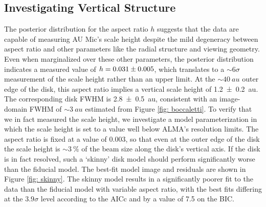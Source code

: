 \documentclass[modern]{aastex62}
\begin{document}
\subsection{Investigating Vertical Structure}
\label{subsection: vertical analysis}

The posterior distribution for the aspect ratio $h$ suggests that the data are capable of measuring AU Mic's scale height despite the mild degeneracy between aspect ratio and other parameters like the radial structure and viewing geometry.  
Even when marginalized over these other parameters, the posterior distribution indicates a measured value of $h=\num{0.031 \pm 0.005}$, which translates to a $\sim 6 \sigma$ measurement of the scale height rather than an upper limit.
At the $\sim \SI{40}{au}$ outer edge of the disk, this aspect ratio implies a vertical scale height of \SI{1.2 \pm 0.2}{au}. 
The corresponding disk FWHM is \SI{2.8 \pm 0.5}{au}, consistent with an image-domain FWHM of $\sim \SI{3}{au}$ estimated from Figure \ref{fig: boccaletti}.
To verify that we in fact measured the scale height, we investigate a model parameterization in which the scale height is set to a value well below ALMA's resolution limits.
The aspect ratio is fixed at a value of $0.003$, so that even at the outer edge of the disk the scale height is $\sim \SI{3}{\percent}$ of the beam size along the disk's vertical axis.
If the disk is in fact resolved, such a `skinny' disk model should perform significantly worse than the fiducial model.
The best-fit model image and residuals are shown in Figure \ref{fig: skinny}.
The skinny model results in a significantly poorer fit to the data than the fiducial model with variable aspect ratio, with the best fits differing at the $3.9 \sigma$ level according to the AICc and by a value of 7.5 on the BIC.
\end{document}
